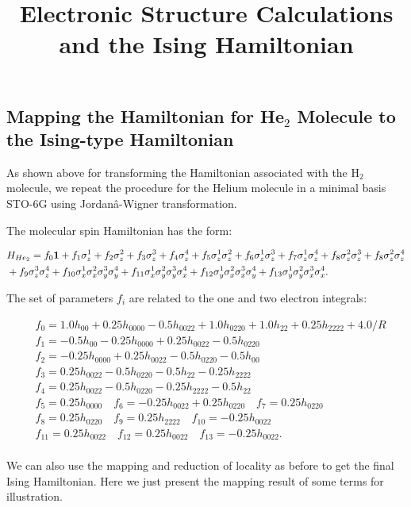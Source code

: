 \documentclass{article}
\newcommand\x[1]{\sigma_x^{#1}}
\newcommand\y[1]{\sigma_y^{#1}}
\newcommand\z[1]{\sigma_z^{#1}}\title{Electronic Structure Calculations and the Ising Hamiltonian}
\begin{document}
\subsection*{Mapping the Hamiltonian for He$_2$ Molecule to the Ising-type Hamiltonian}

As shown above for transforming the Hamiltonian associated with the H$_2$ molecule, we repeat the procedure for the Helium molecule in a minimal basis STO-6G using Jordanâ-Wigner transformation.

The molecular spin Hamiltonian has the form: 

\begin{equation}
\begin{aligned}
&H_{He_2}=f_0{\bf 1}+f_1\z{1}+f_2\z{2}+f_3\z{3}+f_4\z{4}+f_5\z{1}\z{2}+f_6\z{1}\z{3}+f_7\z{1}\z{4}+f_8\z{2}\z{3}+f_8\z{2}\z{4}\\
&+f_9\z{3}\z{4}+f_{10}\x{1}\x{2}\y{3}\y{4}+f_{11}\x{1}\y{2}\y{3}\x{4}+f_{12}\y{1}\x{2}\x{3}\y{4}+f_{13}\y{1}\y{2}\x{3}\x{4} .
\end{aligned}
\end{equation}


The set of parameters ${f_i}$ are related to the one and two electron integrals:

\begin{equation}
\begin{aligned}
&f_0=1.0h_{00} + 0.25h_{0000} - 0.5h_{0022} + 1.0h_{0220} + 1.0h_{22} + 0.25h_{2222} + 4.0/R\\
&f_1=-0.5h_{00} - 0.25h_{0000} + 0.25h_{0022} - 0.5h_{0220}\\
&f_2=-0.25h_{0000} + 0.25h_{0022} - 0.5h_{0220} - 0.5h_{00}\\
&f_3=0.25h_{0022} - 0.5h_{0220} - 0.5h_{22} - 0.25h_{2222}\\
&f_4=0.25h_{0022} - 0.5h_{0220} - 0.25h_{2222} - 0.5h_{22}\\
&f_5=0.25h_{0000}\quad f_6=-0.25h_{0022} + 0.25h_{0220}\quad f_7=0.25h_{0220}\\
&f_8=0.25h_{0220}\quad f_9=0.25h_{2222}\quad f_{10}=-0.25h_{0022}\\ &f_{11}=0.25h_{0022}\quad f_{12}=0.25h_{0022}\quad f_{13}=-0.25h_{0022} . \\
\end{aligned}
\end{equation}

We can also use the mapping and reduction of locality as before to get the final Ising Hamiltonian. Here we just present the mapping result of some terms for illustration.
\end{document}
